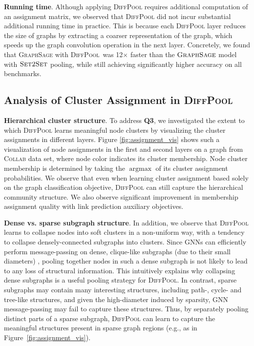 \documentclass{article}
\newcommand{\xhdr}[1]{{\noindent\bfseries #1}.}
\newcommand{\name}{\textsc{DiffPool}\xspace}
\DeclareMathOperator*{\argmax}{argmax}
\begin{document}
\xhdr{Running time} Although applying \name requires additional computation of an assignment matrix, we observed that \name did not incur substantial additional running time in practice.
This is because each \name layer reduces the size of graphs by extracting a coarser representation of the graph, which speeds up the graph convolution operation in the next layer.
Concretely, we found that \textsc{GraphSage} with \name\ was 12$\times$ faster than the $\textsc{GraphSage}$ model with $\textsc{Set2Set}$ pooling, while still achieving significantly higher accuracy on all benchmarks. 


\subsection{Analysis of Cluster Assignment in \name}
\label{sec:assignment_vis}

\xhdr{Hierarchical cluster structure}
To address {\bf Q3}, we investigated the extent to which \name learns meaningful node clusters by visualizing the cluster assignments in different layers. Figure \ref{fig:assignment_vis} shows such a visualization of node assignments in the first and second layers on a graph from \textsc{Collab} data set, where node color indicates its cluster membership. Node cluster membership is determined by taking the $\argmax$ of its cluster assignment probabilities. We observe that even when learning cluster assignment based solely on the graph classification objective, \name can still capture the hierarchical community structure. We also observe significant improvement in membership assignment quality with link prediction auxiliary objectives.

\xhdr{Dense vs. sparse subgraph structure}
In addition, we observe that \name learns to collapse nodes into soft clusters in a non-uniform way, with a tendency to collapse densely-connected subgraphs into clusters. 
Since GNNs can efficiently perform message-passing on dense, clique-like subgraphs (due to their small diameters) \cite{liao2018graph}, pooling together nodes in such a dense subgraph is not likely to lead to any loss of structural information. 
This intuitively explains why collapsing dense subgraphs is a useful pooling strategy for \name. 
In contrast, sparse subgraphs may contain many interesting structures, including path-, cycle- and tree-like structures, and given the high-diameter induced by sparsity, GNN message-passing may fail to capture these structures. 
Thus, by separately pooling distinct parts of a sparse subgraph, \name can learn to capture the meaningful structures present in sparse graph regions (e.g., as in Figure~\ref{fig:assignment_vis}). 
\end{document}
